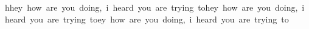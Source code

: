 \documentclass{article}
\begin{document}
\mbox{hhey how are you doing, i heard you are trying tohey how are you doing, i heard you are trying toey how are you doing, i heard you are trying to}
\end{document}
